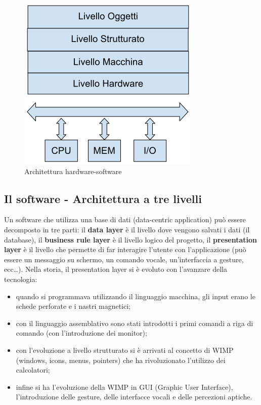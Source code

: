 \begin{center}
\begin{figure}[H]
\centering
\includegraphics[scale=1]{figures/hwsw.png}
\caption{Architettura hardware-software} 
\end{figure}
\end{center}

\subsection{Il software - Architettura a tre livelli}

Un software che utilizza una base di dati (data-centric application) può essere decomposto in tre parti: il \textbf{data layer} è il livello dove vengono salvati i dati (il database), il \textbf{business rule layer} è il livello logico del progetto, il \textbf{presentation layer} è il livello che permette di far interagire l’utente con l’applicazione (può essere un messaggio su schermo, un comando vocale, un’interfaccia a gesture, ecc…).  
Nella storia, il presentation layer si è evoluto con l’avanzare della tecnologia:

\begin{itemize}

\item quando si programmava utilizzando il linguaggio macchina, gli input erano le schede perforate e i nastri magnetici;
\item con il linguaggio assemblativo sono stati introdotti i primi comandi a riga di comando (con l’introduzione dei monitor);
\item con l’evoluzione a livello strutturato si è arrivati al concetto di WIMP (windows, icons, menus, pointers) che ha rivoluzionato l’utilizzo dei calcolatori;
\item infine si ha l’evoluzione della WIMP in GUI (Graphic User Interface), l’introduzione delle gesture, delle interfacce vocali e delle percezioni aptiche. 

\end{itemize}

